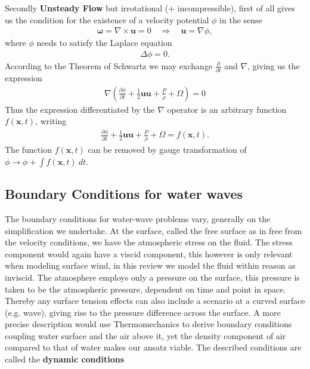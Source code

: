 Secondly \textbf{Unsteady Flow} but irrotational (+ incompressible), first of
all gives us the condition for the existence of a velocity potential $\phi$
in the sense
\begin{align}
    \mathbf{\omega} = \nabla \times  \mathbf{u} = 0  \quad \Rightarrow \quad
    \mathbf{u} = \nabla \phi,
\end{align}
where $\phi$ needs to satisfy the Laplace equation
\begin{align}
    \Delta \phi = 0.
\end{align}
According to the Theorem of Schwartz we may exchange $\frac{\partial
}{\partial t}$ and $\nabla$, giving us the expression
\begin{align}
    \nabla\left( \frac{\partial \phi}{\partial t} +\frac{1}{2}
    \mathbf{u}\mathbf{u} + \frac{P}{\rho}  + \Omega \right) = 0
\end{align}
Thus the expression differentiated by the $\nabla$ operator is an arbitrary
function $f(\mathbf{x}, t)$, writing
\begin{align}
     \frac{\partial \phi}{\partial t} +\frac{1}{2}
    \mathbf{u}\mathbf{u} + \frac{P}{\rho}  + \Omega = f(\mathbf{x}, t).
\end{align}
The function $f(\mathbf{x}, t)$ can be removed by gauge transformation of
$\phi \rightarrow \phi + \int f(\mathbf{x}, t)\ dt$.
\subsection{Boundary Conditions for water waves}
The boundary conditions for water-wave problems vary, generally on the
simplification we undertake. At the surface, called the free surface as in
free from the velocity conditions, we have the atmospheric stress on the
fluid. The stress component would again have a viscid component, this however
is only relevant when modeling surface wind, in this review we model the
fluid within reason as inviscid. The atmosphere employs
only a pressure on the surface, this pressure is taken to be the atmospheric
pressure, dependent on time and point in space. Thereby  any surface tension
effects can also include a scenario at a curved surface (e.g. wave), giving
rise to the pressure difference across the surface. A more precise
description would use Thermomechanics to derive boundary conditions coupling
water surface and the air above it, yet the density component of air
compared to that of water makes our ansatz viable. The described conditions
are called the \textbf{dynamic conditions}

